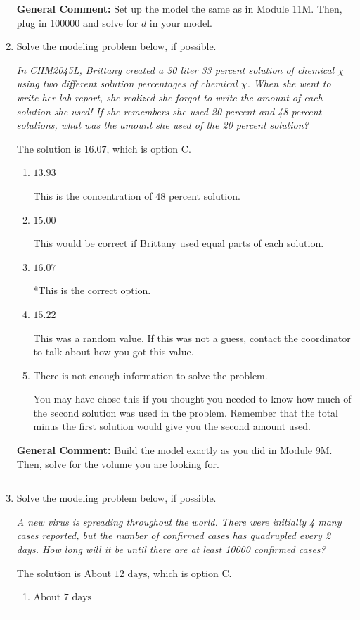 \documentclass{extbook}[14pt]
\newcommand{\litem}[1]{\item #1

\rule{\textwidth}{0.4pt}}
\begin{document}
\begin{enumerate}
{\textbf{General Comment:} Set up the model the same as in Module 11M. Then, plug in 100000 and solve for $d$ in your model.
}
\litem{
Solve the modeling problem below, if possible.

\begin{center}
    \textit{ In CHM2045L, Brittany created a 30 liter 33 percent solution of chemical $\chi$ using two different solution percentages of chemical $\chi$. When she went to write her lab report, she realized she forgot to write the amount of each solution she used! If she remembers she used 20 percent and 48 percent solutions, what was the amount she used of the 20 percent solution? }
\end{center}


The solution is \( 16.07 \), which is option C.\begin{enumerate}[label=\Alph*.]
\item \( 13.93 \)

This is the concentration of 48 percent solution.
\item \( 15.00 \)

This would be correct if Brittany used equal parts of each solution.
\item \( 16.07 \)

*This is the correct option.
\item \( 15.22 \)

This was a random value. If this was not a guess, contact the coordinator to talk about how you got this value.
\item \( \text{There is not enough information to solve the problem.} \)

You may have chose this if you thought you needed to know how much of the second solution was used in the problem. Remember that the total minus the first solution would give you the second amount used.
\end{enumerate}

\textbf{General Comment:} Build the model exactly as you did in Module 9M. Then, solve for the volume you are looking for.
}
\litem{
Solve the modeling problem below, if possible.

\begin{center}
    \textit{ A new virus is spreading throughout the world. There were initially 4 many cases reported, but the number of confirmed cases has quadrupled every 2 days. How long will it be until there are at least 10000 confirmed cases? }
\end{center}


The solution is \( \text{About } 12 \text{ days} \), which is option C.\begin{enumerate}[label=\Alph*.]
\item \( \text{About } 7 \text{ days} \)


\end{enumerate}}
\end{enumerate}
\end{document}
